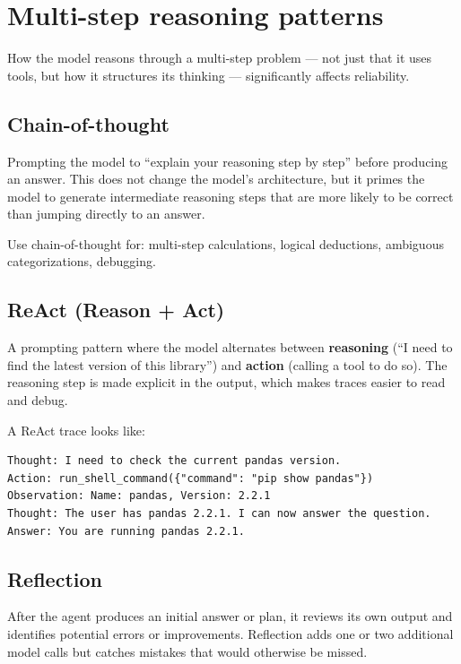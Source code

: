 \section{Multi-step reasoning patterns}

How the model reasons through a multi-step problem --- not just that it uses tools, but how it structures its thinking --- significantly affects reliability.

\subsection{Chain-of-thought}

Prompting the model to ``explain your reasoning step by step'' before producing an answer. This does not change the model's architecture, but it primes the model to generate intermediate reasoning steps that are more likely to be correct than jumping directly to an answer.

Use chain-of-thought for: multi-step calculations, logical deductions, ambiguous categorizations, debugging.

\subsection{ReAct (Reason + Act)}

A prompting pattern where the model alternates between \textbf{reasoning} (``I need to find the latest version of this library'') and \textbf{action} (calling a tool to do so). The reasoning step is made explicit in the output, which makes traces easier to read and debug.

A ReAct trace looks like:

\begin{verbatim}
Thought: I need to check the current pandas version.
Action: run_shell_command({"command": "pip show pandas"})
Observation: Name: pandas, Version: 2.2.1
Thought: The user has pandas 2.2.1. I can now answer the question.
Answer: You are running pandas 2.2.1.
\end{verbatim}

\subsection{Reflection}

After the agent produces an initial answer or plan, it reviews its own output and identifies potential errors or improvements. Reflection adds one or two additional model calls but catches mistakes that would otherwise be missed.

